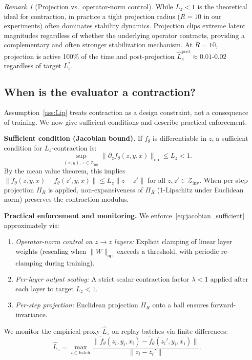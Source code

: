 \documentclass{article}
\theoremstyle{plain}
\theoremstyle{definition}
\theoremstyle{remark}
\newtheorem{remark}[theorem]{Remark}
\begin{document}
{\begin{remark}[Projection vs.\ operator-norm control]
\label{rem:projection_vs_contraction}
While $L_z < 1$ is the theoretical ideal for contraction, in practice a tight projection radius ($R{=}10$ in our experiments) often dominates stability dynamics. Projection clips extreme latent magnitudes regardless of whether the underlying operator contracts, providing a complementary and often stronger stabilization mechanism. At $R{=}10$, projection is active 100\% of the time and post-projection $\hat{L}_z^{\text{post}} \approx 0.01$-$0.02$ regardless of target $L^*_z$.
\end{remark}

\subsection{When is the evaluator a contraction?}
\label{sec:when_contraction}

Assumption~\ref{ass:Lip} treats contraction as a design constraint, not a consequence of training.
We now give sufficient conditions and describe practical enforcement.

\textbf{Sufficient condition (Jacobian bound).}
If $f_\theta$ is differentiable in $z$, a sufficient condition for $L_z$-contraction is:
\begin{equation}
\sup_{(x,y),\, z\in\mathcal{Z}_{\mathrm{inv}}}\|\partial_z f_\theta(z,y,x)\|_{\mathrm{op}} \le L_z < 1.
\label{eq:jacobian_sufficient}
\end{equation}
By the mean value theorem, this implies $\|f_\theta(z,y,x)-f_\theta(z',y,x)\|\le L_z\|z-z'\|$ for all $z,z'\in\mathcal{Z}_{\mathrm{inv}}$.
When per-step projection $\Pi_R$ is applied, non-expansiveness of $\Pi_R$ (1-Lipschitz under Euclidean norm) preserves the contraction modulus.

\textbf{Practical enforcement and monitoring.}
We enforce~\eqref{eq:jacobian_sufficient} approximately via:
\begin{enumerate}
\item \emph{Operator-norm control on $z\!\to\!z$ layers:} Explicit clamping of linear layer weights (rescaling when $\|W\|_{\mathrm{op}}$ exceeds a threshold, with periodic re-clamping during training).
\item \emph{Per-layer output scaling:} A strict scalar contraction factor $\lambda<1$ applied after each layer to target $L_z<1$.
\item \emph{Per-step projection:} Euclidean projection $\Pi_R$ onto a ball ensures forward-invariance.
\end{enumerate}
We monitor the empirical proxy $\hat L_z$ on replay batches via finite differences:
\begin{equation}
\hat L_z = \max_{i\in\text{batch}} \frac{\|\tilde f_\theta(z_i,y_i,x_i) - \tilde f_\theta(z_i',y_i,x_i)\|}{\|z_i - z_i'\|}.
\label{eq:Lz_empirical}
\end{equation}

}
\end{document}
